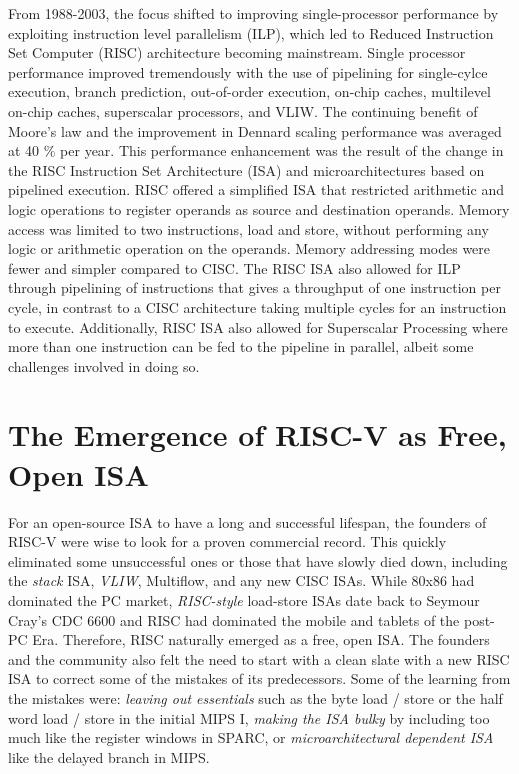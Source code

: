 \documentclass[journal]{IEEEtran}
\begin{document}
From 1988-2003, the focus shifted to improving single-processor performance by exploiting instruction level parallelism (ILP), which led to Reduced Instruction Set Computer (RISC) architecture \cite{patterson_risc_1998} becoming mainstream. Single processor performance improved tremendously with the use of pipelining for single-cylce execution, branch prediction, out-of-order execution, on-chip caches, multilevel on-chip caches, superscalar processors, and VLIW. The continuing benefit of Moore's law and the improvement in Dennard scaling performance was averaged at 40 \% per year.
This performance enhancement was the result of the change in the RISC Instruction Set Architecture (ISA) and microarchitectures based on pipelined execution. RISC offered a simplified ISA that restricted arithmetic and logic operations to register operands as source and destination operands. Memory access was limited to two instructions, load and store, without performing any logic or arithmetic operation on the operands. Memory addressing modes were fewer and simpler compared to CISC. The RISC ISA also allowed for ILP through pipelining of instructions that gives a throughput of one instruction per cycle, in contrast to a CISC architecture taking multiple cycles for an instruction to execute. Additionally, RISC ISA also allowed for Superscalar Processing where more than one instruction can be fed to the pipeline in parallel, albeit some challenges involved in doing so.

 
\section{The Emergence of RISC-V as Free, Open ISA }
For an open-source ISA to have a long and successful lifespan, the founders of RISC-V were wise to look for a proven commercial record. This quickly eliminated some unsuccessful ones or those that have slowly died down, including the \textit{ stack} ISA, \textit{VLIW}, Multiflow, and any new CISC ISAs. While 80x86 had dominated the PC market, \textit{RISC-style} load-store ISAs date back to Seymour Cray's CDC 6600 and RISC had dominated the mobile and tablets of the post-PC Era. Therefore, RISC naturally emerged as a free, open ISA. The founders and the community also felt the need to start with a clean slate with a new RISC ISA to correct some of the mistakes of its predecessors. Some of the learning from the mistakes were: \textit{leaving out essentials} such as the byte load / store or the half word load / store in the initial MIPS I, \textit{making the ISA bulky} by including too much like the register windows in SPARC, or \textit{microarchitectural dependent ISA} like the delayed branch in MIPS. 
\end{document}

